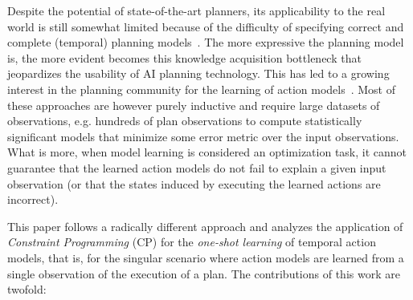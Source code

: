 \documentclass{ecai}
\begin{document}
Despite the potential of state-of-the-art planners, its applicability to the real world is still somewhat limited because of the difficulty of specifying correct and complete (temporal) planning models~\cite{kambhampati2007model}. The more expressive the planning model is, the more evident becomes this knowledge acquisition bottleneck that jeopardizes the usability of AI planning technology. This has led to a growing interest in the planning community for the learning of action models~\cite{kuvcera2018louga,MouraoZPS12,yang2007learning,zhuo2013action}. Most of these approaches are however purely inductive and require large datasets of observations, e.g. hundreds of plan observations to compute statistically significant models that minimize some error metric over the input observations. What is more, when model learning is considered an optimization task, it cannot guarantee that the learned action models do not fail to explain a given input observation (or that the states induced by executing the learned actions are incorrect).

This paper follows a radically different approach and analyzes the application of {\em Constraint Programming} (CP) for the {\em one-shot learning} of temporal action models, that is, for the singular scenario where action models are learned from a single observation of the execution of a plan. The contributions of this work are twofold:
\end{document}

